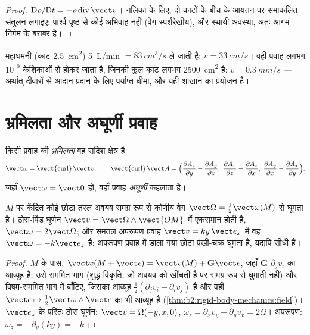 \begin{proof}
$\mathrm D\rho/\mathrm Dt = -\rho\operatorname{div}\vect v$। नलिका के लिए,
दो काटों के बीच के आयतन पर समाकलित संतुलन लगाइए: पार्श्व पृष्ठ से कोई
अभिवाह नहीं (वेग स्पर्शरेखीय), और स्थायी अवस्था, अतः
आगम निर्गम के बराबर है।
\end{proof}

\begin{example}[रक्त]\label{ex:b2:fluid-kinematics:blood}
महाधमनी (काट \qty{2.5}{cm^2}) \qty{5}{L/min} $= \qty{83}{cm^3/s}$ ले जाती है:
$v = \qty{33}{cm/s}$। वही प्रवाह लगभग $10^{10}$
केशिकाओं से होकर जाता है, जिनकी कुल काट लगभग \qty{2500}{cm^2} है: $v = \qty{0.3}{mm/s}$ ---
अर्थात् दीवारों से आदान-प्रदान के लिए पर्याप्त धीमा, और यही शाखान का प्रयोजन है।
\end{example}

\section{भ्रमिलता और अघूर्णी प्रवाह}

\begin{definition}[भ्रमिलता]\label{def:b2:fluid-kinematics:vorticity}
किसी प्रवाह की \emph{भ्रमिलता} वह सदिश क्षेत्र है
\[
\vect\omega = \operatorname{\vect{curl}}\vect v , \qquad
\operatorname{\vect{curl}}\vect A = \Bigl(\frac{\partial A_z}{\partial y} -
\frac{\partial A_y}{\partial z},\; \frac{\partial A_x}{\partial z} - \frac{\partial A_z}
{\partial x},\; \frac{\partial A_y}{\partial x} - \frac{\partial A_x}{\partial y}\Bigr) .
\]
जहाँ $\vect\omega = \vect 0$ हो, वहाँ प्रवाह \emph{अघूर्णी} कहलाता है।
\end{definition}

\begin{proposition}[भ्रमिलता स्थानिक घूर्णन मापती है]\label{prop:b2:fluid-kinematics:rotation}
$M$ पर केंद्रित कोई छोटा तरल अवयव समग्र रूप से कोणीय वेग
$\vect\Omega = \tfrac12\vect\omega(M)$ से घूमता है। ठोस-पिंड
घूर्णन $\vect v = \vect\Omega\wedge\vect{OM}$ में  एकसमान होती है,
$\vect\omega = 2\vect\Omega$; और समतल अपरूपण प्रवाह $\vect v = ky\,\vect e_x$
में वह $\vect\omega = -k\vect e_z$ है: अपरूपण प्रवाह में डाला गया छोटा
पंखी-चक्र घूमता है, यद्यपि  सीधी हैं।
\end{proposition}

\begin{proof}
$M$ के पास, $\vect v(M + \vect\epsilon) = \vect v(M) + \mathbf G\vect\epsilon$, जहाँ
$\mathbf G$ $\partial_jv_i$ का आव्यूह है; उसे सममित भाग
(शुद्ध विकृति, जो अवयव को खींचती है पर समग्र रूप से घुमाती नहीं)
और विषम-सममित भाग में बाँटिए, जिसका आव्यूह $\tfrac12(\partial_jv_i -
\partial_iv_j)$ है और वही $\vect\epsilon \mapsto \tfrac12\vect\omega\wedge\vect\epsilon$ का भी आव्यूह है
(\cref{thm:b2:rigid-body-mechanics:field})। $\vect e_z$ के परितः ठोस घूर्णन:
$\vect v = \Omega(-y, x, 0)$, $\omega_z = \partial_xv_y - \partial_yv_x = 2\Omega$।
अपरूपण: $\omega_z = -\partial_y(ky) = -k$।
\end{proof}

